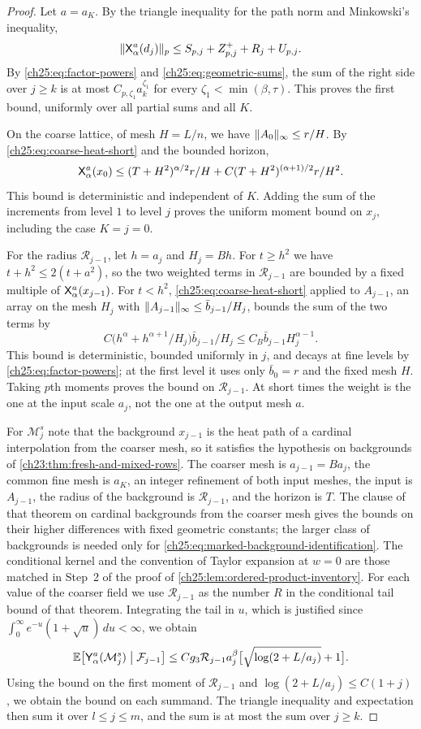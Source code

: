 \begin{proof}
Let $a=a_K$. By the triangle inequality for the path norm and Minkowski's inequality,
\[
 \lVert \mathsf X_{\alpha}^{a}(d_j)\rVert_p\le S_{p,j}+Z^+_{p,j}+R_j+U_{p,j}.
\]
By \eqref{ch25:eq:factor-powers} and \eqref{ch25:eq:geometric-sums}, the sum of the right side over $j\ge k$ is at most $C_{p,\zeta_1}a_k^{\zeta_1}$ for every $\zeta_1<\min(\beta,\tau)$. This proves the first bound, uniformly over all partial sums and all $K$.

On the coarse lattice, of mesh $H=L/n$, we have $\lVert A_0\rVert_\infty\le r/H$. By \eqref{ch25:eq:coarse-heat-short} and the bounded horizon,
\[
 \mathsf X_{\alpha}^{a}(x_0)\le(T+H^2)^{\alpha/2}r/H+C(T+H^2)^{(\alpha+1)/2}r/H^2.
\]
This bound is deterministic and independent of $K$. Adding the sum of the increments from level $1$ to level $j$ proves the uniform moment bound on $x_j$, including the case $K=j=0$.

For the radius $\mathcal R_{j-1}$, let $h=a_j$ and $H_j=Bh$. For $t\ge h^2$ we have $t+h^2\le2(t+a^2)$, so the two weighted terms in $\mathcal R_{j-1}$ are bounded by a fixed multiple of $\mathsf X_{\alpha}^{a}(x_{j-1})$. For $t<h^2$, \eqref{ch25:eq:coarse-heat-short} applied to $A_{j-1}$, an array on the mesh $H_j$ with $\lVert A_{j-1}\rVert_\infty\le\bar b_{j-1}/H_j$, bounds the sum of the two terms by
\[
 C\bigl(h^\alpha+h^{\alpha+1}/H_j\bigr)\bar b_{j-1}/H_j\le C_B\bar b_{j-1}H_j^{\alpha-1}.
\]
This bound is deterministic, bounded uniformly in $j$, and decays at fine levels by \eqref{ch25:eq:factor-powers}; at the first level it uses only $\bar b_0=r$ and the fixed mesh $H$. Taking $p$th moments proves the bound on $\mathcal R_{j-1}$. At short times the weight is the one at the input scale $a_j$, not the one at the output mesh $a$.

For $\mathcal M_j^s$ note that the background $x_{j-1}$ is the heat path of a cardinal interpolation from the coarser mesh, so it satisfies the hypothesis on backgrounds of \cref{ch23:thm:fresh-and-mixed-rows}. The coarser mesh is $a_{j-1}=Ba_j$, the common fine mesh is $a_K$, an integer refinement of both input meshes, the input is $A_{j-1}$, the radius of the background is $\mathcal R_{j-1}$, and the horizon is $T$. The clause of that theorem on cardinal backgrounds from the coarser mesh gives the bounds on their higher differences with fixed geometric constants; the larger class of backgrounds is needed only for \eqref{ch25:eq:marked-background-identification}. The conditional kernel and the convention of Taylor expansion at $w=0$ are those matched in Step~2 of the proof of \cref{ch25:lem:ordered-product-inventory}. For each value of the coarser field we use $\mathcal R_{j-1}$ as the number $R$ in the conditional tail bound of that theorem. Integrating the tail in $u$, which is justified since $\int_0^\infty e^{-u}(1+\sqrt u)\,du<\infty$, we obtain
\[
 \mathbb E\bigl[\mathsf Y_{\alpha}^{a}(\mathcal M_j^s)\bigm|\mathcal F_{j-1}\bigr]\le Cg_3\mathcal R_{j-1}a_j^\beta\bigl[\sqrt{\log(2+L/a_j)}+1\bigr].
\]
Using the bound on the first moment of $\mathcal R_{j-1}$ and $\log(2+L/a_j)\le C(1+j)$, we obtain the bound on each summand. The triangle inequality and expectation then sum it over $l\le j\le m$, and the sum is at most the sum over $j\ge k$.


\end{proof}
